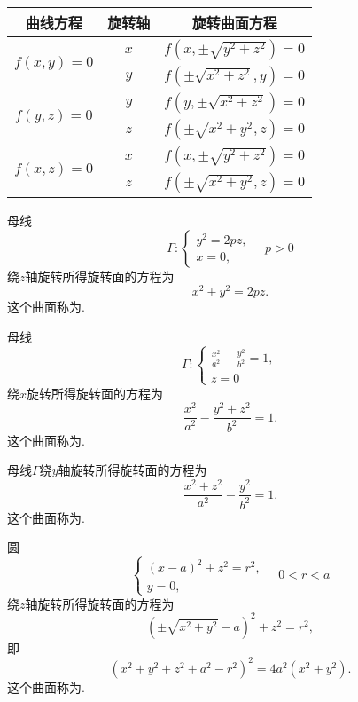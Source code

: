 \begin{table}[htb]
	\centering
	\begin{tabular}{|c|c|c|}
	\hline
	曲线方程 & 旋转轴 & 旋转曲面方程 \\ \hline
	\multirow{2}{*}{\(f(x,y)=0\)} & \(x\) & \(f(x,\pm\sqrt{y^2+z^2})=0\) \\ \cline{2-3}
		& \(y\) & \(f(\pm\sqrt{x^2+z^2},y)=0\) \\ \hline
	\multirow{2}{*}{\(f(y,z)=0\)} & \(y\) & \(f(y,\pm\sqrt{x^2+z^2})=0\) \\ \cline{2-3}
		& \(z\) & \(f(\pm\sqrt{x^2+y^2},z)=0\) \\ \hline
	\multirow{2}{*}{\(f(x,z)=0\)} & \(x\) & \(f(x,\pm\sqrt{y^2+z^2})=0\) \\ \cline{2-3}
		& \(z\) & \(f(\pm\sqrt{x^2+y^2},z)=0\) \\
	\hline
	\end{tabular}
	\caption{}
\end{table}


\begin{example}
母线\[
	\Gamma: \left\{ \begin{array}{l}
		y^2 = 2pz, \\
		x = 0,
	\end{array} \right.
	\quad p>0
\]
绕\(z\)轴旋转所得旋转面的方程为\[
	x^2+y^2=2pz.
\]
这个曲面称为.
\end{example}

\begin{example}
母线\[
	\Gamma: \left\{ \begin{array}{l}
		\frac{x^2}{a^2}-\frac{y^2}{b^2}=1, \\
		z=0
	\end{array} \right.
\]
绕\(x\)旋转所得旋转面的方程为\[
	\frac{x^2}{a^2}-\frac{y^2+z^2}{b^2}=1.
\]
这个曲面称为.

母线\(\Gamma\)绕\(y\)轴旋转所得旋转面的方程为\[
	\frac{x^2+z^2}{a^2}-\frac{y^2}{b^2}=1.
\]
这个曲面称为.
\end{example}

\begin{example}
圆\[
	\left\{ \begin{array}{l}
		(x-a)^2+z^2=r^2, \\
		y=0,
	\end{array} \right.
	\quad 0<r<a
\]
绕\(z\)轴旋转所得旋转面的方程为\[
	(\pm\sqrt{x^2+y^2}-a)^2+z^2=r^2,
\]
即\[
	(x^2+y^2+z^2+a^2-r^2)^2=4a^2(x^2+y^2).
\]
这个曲面称为.
\end{example}

